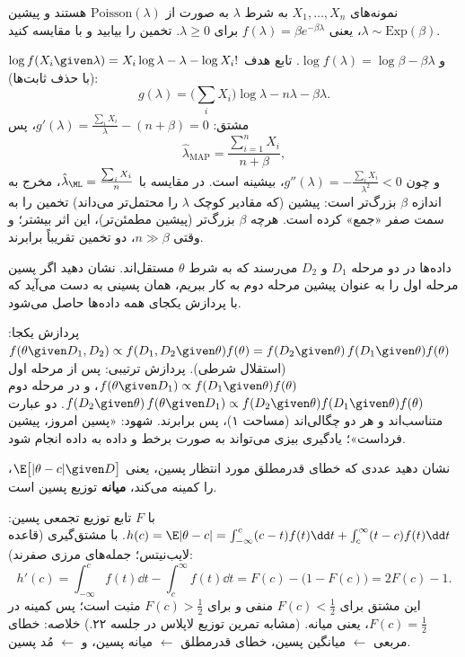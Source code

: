 \begin{exercise}
نمونه‌های $X_1,\ldots,X_n$ به شرط $\lambda$ به صورت  از $\mathrm{Poisson}(\lambda)$ هستند و پیشین $\lambda\sim\mathrm{Exp}(\beta)$، یعنی $f(\lambda)=\beta e^{-\beta\lambda}$ برای $\lambda\ge0$. تخمین  را بیابید و با  مقایسه کنید.
\end{exercise}
\begin{solution}
$\log f(X_i\given\lambda)=X_i\log\lambda-\lambda-\log X_i!$ و $\log f(\lambda)=\log\beta-\beta\lambda$. تابع هدف (با حذف ثابت‌ها):
\[
g(\lambda)=\Big(\sum_iX_i\Big)\log\lambda-n\lambda-\beta\lambda .
\]
مشتق: $g'(\lambda)=\frac{\sum_iX_i}{\lambda}-(n+\beta)=0$، پس
\[
\hat\lambda_{\mathrm{MAP}}=\frac{\sum_{i=1}^nX_i}{n+\beta},
\]
و چون $g''(\lambda)=-\frac{\sum_iX_i}{\lambda^2}<0$، بیشینه است. در مقایسه با $\hat\lambda_\ML=\frac{\sum_iX_i}{n}$، مخرج به اندازه $\beta$ بزرگ‌تر است: پیشین (که مقادیر کوچک $\lambda$ را محتمل‌تر می‌داند) تخمین را به سمت صفر «جمع» کرده است. هرچه $\beta$ بزرگ‌تر (پیشین مطمئن‌تر)، این اثر بیشتر؛ و وقتی $n\gg\beta$، دو تخمین تقریباً برابرند.
\end{solution}

\begin{exercise}
داده‌ها در دو مرحله $D_1$ و $D_2$ می‌رسند که به شرط $\theta$ مستقل‌اند. نشان دهید اگر پسین مرحله اول را به عنوان پیشین مرحله دوم به کار ببریم، همان پسینی به دست می‌آید که با پردازش یکجای همه داده‌ها حاصل می‌شود.
\end{exercise}
\begin{solution}
پردازش یکجا: $f(\theta\given D_1,D_2)\propto f(D_1,D_2\given\theta)f(\theta)=f(D_2\given\theta)\,f(D_1\given\theta)f(\theta)$ (استقلال شرطی). پردازش ترتیبی: پس از مرحله اول $f(\theta\given D_1)\propto f(D_1\given\theta)f(\theta)$، و در مرحله دوم $f(D_2\given\theta)\,f(\theta\given D_1)\propto f(D_2\given\theta)f(D_1\given\theta)f(\theta)$. دو عبارت متناسب‌اند و هر دو چگالی‌اند (مساحت ۱)، پس برابرند. شهود: «پسین امروز، پیشین فرداست»؛ یادگیری بیزی می‌تواند به صورت برخط  و داده به داده انجام شود.
\end{solution}

\begin{exercise}
نشان دهید عددی که خطای قدرمطلق مورد انتظار پسین، یعنی $\E\big[|\theta-c|\given D\big]$، را کمینه می‌کند، \textbf{میانه} توزیع پسین است.
\end{exercise}
\begin{solution}
با $F$ تابع توزیع تجمعی پسین: $h(c)=\E|\theta-c|=\int_{-\infty}^c(c-t)f(t)\dd t+\int_c^\infty(t-c)f(t)\dd t$. با مشتق‌گیری (قاعده لایب‌نیتس؛ جمله‌های مرزی صفرند):
\[
h'(c)=\int_{-\infty}^cf(t)\dd t-\int_c^\infty f(t)\dd t=F(c)-\big(1-F(c)\big)=2F(c)-1 .
\]
این مشتق برای $F(c)<\frac12$ منفی و برای $F(c)>\frac12$ مثبت است؛ پس کمینه در $F(c)=\frac12$، یعنی میانه. (مشابه تمرین توزیع لاپلاس در جلسه ۲۲.) خلاصه: خطای مربعی $\leftarrow$ میانگین پسین، خطای قدرمطلق $\leftarrow$ میانه پسین، و  $\leftarrow$ مُد پسین.
\end{solution}
